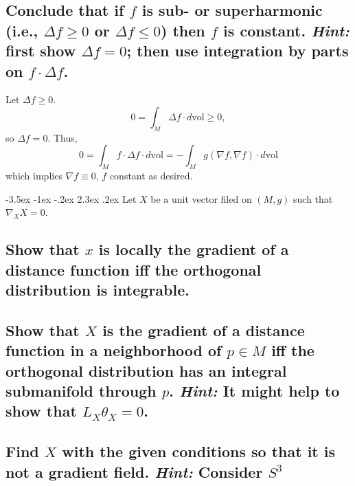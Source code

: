 \documentclass[10pt]{article}
\makeatletter
\renewcommand\section{\@startsection{section}{1}{\z@}%
                                  {-3.5ex \@plus -1ex \@minus -.2ex}%
                                  {2.3ex \@plus.2ex}%
                                  {\normalfont\large\bfseries}}
\newcommand{\vol}{{\mbox{vol}} }
\newcommand{\hint}[1]{{\emph{Hint:} #1}} %
\makeatother
\begin{document}
\subsection{Conclude that if $f$ is sub- or superharmonic (i.e., $\Delta f \geq 0$ or $\Delta f \leq 0$) then $f$ is constant. \hint{first show $\Delta f =0$; then use integration by parts on $f \cdot \Delta f$.}}
Let $\Delta f \geq 0$. 
\[ 0 = \int_M \Delta f \cdot d \vol \geq 0,\]
so $\Delta f = 0$. Thus,
\[0 = \int_M f \cdot \Delta f \cdot d \vol = - \int_M g( \nabla f, \nabla f) \cdot d \vol\]
which implies $\nabla f \equiv 0$, $f$ constant as desired. 

\section{Let $X$ be a unit vector filed on $(M,g)$ such that $\nabla_X X =0$.}
\subsection{Show that $x$ is locally the gradient of a distance function iff the orthogonal distribution is integrable.}
\subsection{Show that $X$ is the gradient of a distance function in a neighborhood of $p \in M$ iff the orthogonal distribution has an integral submanifold through $p$. \hint{It might help to show that $L_X \theta_X =0$.}}
\subsection{Find $X$ with the given conditions so that it is not a gradient field. \hint{Consider $S^3$}}
\end{document}
